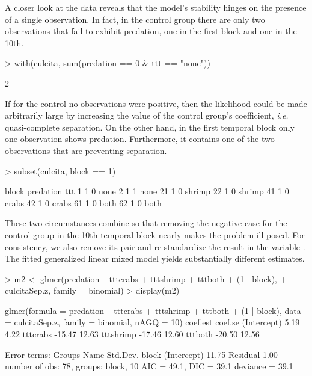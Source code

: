 \documentclass[article,shortnames]{jss}
\begin{document}
A closer look at the data reveals that the model's stability hinges on
the presence of a single observation. In fact, in the control group there are
only two observations that fail to exhibit predation, one in the first
block and one in the 10th.

\begin{Schunk}
\begin{Sinput}
> with(culcita, sum(predation == 0 & ttt == "none"))
\end{Sinput}
\begin{Soutput}
[1] 2
\end{Soutput}
\end{Schunk}

If for the control no observations were positive, then the likelihood
could be made arbitrarily large by increasing the value of the
control group's coefficient, {\em i.e.} quasi-complete separation. On
the other hand, in the first temporal block only one observation
shows predation. Furthermore, it contains one of the two observations
that are preventing separation.

\begin{Schunk}
\begin{Sinput}
> subset(culcita, block == 1)
\end{Sinput}
\begin{Soutput}
   block predation    ttt
1      1         0   none
2      1         1   none
21     1         0 shrimp
22     1         0 shrimp
41     1         0  crabs
42     1         0  crabs
61     1         0   both
62     1         0   both
\end{Soutput}
\end{Schunk}

These two circumstances combine so that removing the negative
case for the control group in the 10th temporal block nearly makes the
problem ill-posed. For consistency, we also remove its pair and re-standardize the
result in the variable .  The
fitted generalized linear mixed model yields substantially different
estimates.

\begin{Schunk}
\begin{Sinput}
> m2 <- glmer(predation ~ tttcrabs + tttshrimp + tttboth + (1 | block),
+             culcitaSep.z, family = binomial)
> display(m2)
\end{Sinput}
\end{Schunk}

\begin{Schunk}
\begin{Soutput}
glmer(formula = predation ~ tttcrabs + tttshrimp + tttboth + 
    (1 | block), data = culcitaSep.z, family = binomial, nAGQ = 10)
            coef.est coef.se
(Intercept)   5.19     4.22 
tttcrabs    -15.47    12.63 
tttshrimp   -17.46    12.60 
tttboth     -20.50    12.56 

Error terms:
 Groups   Name        Std.Dev.
 block    (Intercept) 11.75   
 Residual              1.00   
---
number of obs: 78, groups: block, 10
AIC = 49.1, DIC = 39.1
deviance = 39.1 
\end{Soutput}
\end{Schunk}
\end{document}
